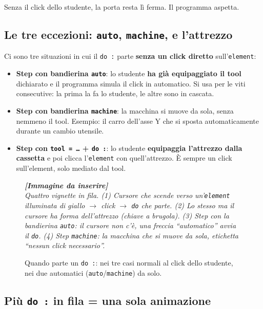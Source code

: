 ﻿\documentclass[a4paper,12pt,oneside]{book}
\newcommand{\kw}[1]{\texttt{\color{keycolor}#1}}
\newcommand{\val}[1]{\texttt{\color{cvtgreen}#1}}
\newcommand{\imgph}[2]{%
  \begin{tcolorbox}[colback=cvtlightblue!30,colframe=cvtblue!40,%
    width=#1,halign=center,valign=center,height=5cm,boxrule=0.5pt,arc=3pt]%
    \textcolor{cvtgray}{\itshape\footnotesize\textbf{[Immagine da inserire]}\\[3pt]#2}%
  \end{tcolorbox}}
\begin{document}
Senza il click dello studente, la porta resta lì ferma. Il programma aspetta.

\subsection{Le tre eccezioni: \texttt{auto}, \texttt{machine}, e l'attrezzo}

Ci sono tre situazioni in cui il \kw{do :} parte \textbf{senza un click
diretto} sull'\kw{element}:

\begin{itemize}
  \item \textbf{Step con bandierina \val{auto}}: lo studente \textbf{ha già
        equipaggiato il tool} dichiarato e il programma simula il click in
        automatico. Si usa per le viti consecutive: la prima la fa lo
        studente, le altre sono in cascata.
  \item \textbf{Step con bandierina \val{machine}}: la macchina si muove da
        sola, senza nemmeno il tool. Esempio: il carro dell'asse Y che si
        sposta automaticamente durante un cambio utensile.
  \item \textbf{Step con \kw{tool = \ldots} + \kw{do :}}: lo studente
        \textbf{equipaggia l'attrezzo dalla cassetta} e poi clicca
        l'\kw{element} con quell'attrezzo. È sempre un click sull'element,
        solo mediato dal tool.
\end{itemize}

\begin{figure}[H]
  \centering
  \imgph{13cm}{Quattro vignette in fila. (1) Cursore che scende verso un'\kw{element} illuminata di giallo $\rightarrow$ click $\rightarrow$ \kw{do} che parte. (2) Lo stesso ma il cursore ha forma dell'attrezzo (chiave a brugola). (3) Step con la bandierina \val{auto}: il cursore non c'è, una freccia ``automatico'' avvia il \kw{do}. (4) Step \val{machine}: la macchina che si muove da sola, etichetta ``nessun click necessario''.}
  \caption{Quando parte un \kw{do :}: nei tre casi normali al click dello studente, nei due automatici (\val{auto}/\val{machine}) da solo.}
  \label{fig:do-quando-parte}
\end{figure}

\subsection{Più \texttt{do :} in fila = una sola animazione}
\end{document}
